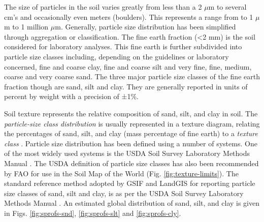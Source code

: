 \documentclass[graybox,natbib,nospthms,UStrade]{svmono}
\begin{document}
The size of particles in the soil varies greatly from less than a 2 \(\mu\)m to
several cm's and occasionally even meters (boulders). This represents a
range from to 1 \(\mu\)m to 1 million \(\mu\)m. Generally, particle size distribution has been
simplified through aggregation or classification. The fine earth
fraction (\textless{}2 mm) is the soil considered for laboratory analyses. This fine
earth is further subdivided into particle size classes including,
depending on the guidelines or laboratory concerned, fine and coarse
clay, fine and coarse silt and very fine, fine, medium, coarse and very
coarse sand. The three major particle size classes of the fine earth
fraction though are sand, silt and clay. They are generally reported in
units of percent by weight with a precision of ±1\%.

Soil texture represents the relative composition of sand, silt, and clay
in soil. The \emph{particle-size class distribution} is usually represented
in a texture diagram, relating the percentages of sand, silt, and clay
(mass percentage of fine earth) to a \emph{texture class} \citep{Minasny2001AJSR}.
Particle size distribution has been defined using a number of systems.
One of the most widely used systems is the USDA Soil Survey Laboratory
Methods Manual \citep{Burt2004SSIR}. The USDA definition of particle size
classes has also been recommended by FAO for use in the Soil Map of the
World (Fig. \ref{fig:texture-limits}). The standard reference method adopted by
GSIF and LandGIS for reporting particle size classes of sand, silt and clay, is as
per the USDA Soil Survey Laboratory Methods Manual \citep[ p.347]{Burt2004SSIR}. An estimated global distribution of sand, silt, and clay is
given in Figs. \ref{fig:sprofs-snd}, \ref{fig:sprofs-slt} and
\ref{fig:sprofs-cly}.
\end{document}
